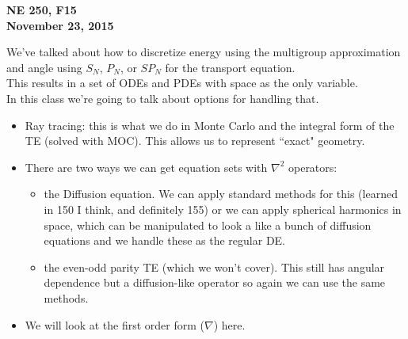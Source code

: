 \documentclass[12pt]{article}
\begin{document}
\begin{center}
{\bf NE 250, F15\\
November 23, 2015 
}
\end{center}

We've talked about how to discretize energy using the multigroup approximation and angle using $S_N$, $P_N$, or $SP_N$ for the transport equation. \\
This results in a set of ODEs and PDEs with space as the only variable.\\
In this class we're going to talk about options for handling that.
\begin{itemize}
\item Ray tracing: this is what we do in Monte Carlo and the integral form of the TE (solved with MOC). This allows us to represent ``exact" geometry.
\item There are two ways we can get equation sets with $\nabla^2$ operators: 
  \begin{itemize}
  \item the Diffusion equation. We can apply standard methods for this (learned in 150 I think, and definitely 155) or we can apply spherical harmonics in space, which can be manipulated to look a like a bunch of diffusion equations and we handle these as the regular DE.
  \item the even-odd parity TE (which we won't cover). This still has angular dependence but a diffusion-like operator so again we can use the same methods.
  \end{itemize}
\item We will look at the first order form ($\nabla$) here. 
\end{itemize}
\end{document}
